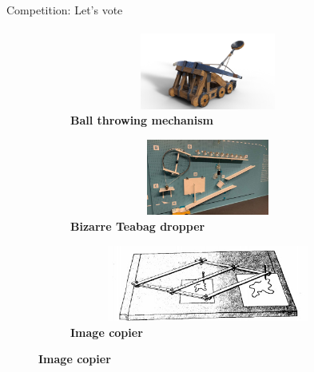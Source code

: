 \documentclass[aspectratio=169]{beamer}
\begin{document}
\begin{frame}[c]{Competition: Let's vote}
    \framesubtitle{}
    \vspace{-0.6cm}
    \begin{figure}[H]
        \begin{subfigure}[t]{0.32\textwidth}
            \centering\includegraphics[height=2.5cm,width=1\textwidth,keepaspectratio]{catapuylt.png}
            \caption{\textbf{Ball throwing mechanism}}
            \label{fig:catapuylt.png}
        \end{subfigure}
        \begin{subfigure}[t]{0.32\textwidth}
            \centering\includegraphics[height=2.5cm,width=1\textwidth,keepaspectratio]{overengineering.jpg}
            \caption{\textbf{Bizarre Teabag dropper}}
            \label{fig:overengineering.jpg}
        \end{subfigure}
        \begin{subfigure}[t]{0.32\textwidth}
            \centering\includegraphics[height=2.5cm,width=1\textwidth,keepaspectratio]{copycat.jpeg}
            \caption{\textbf{Image copier}}
            \label{fig:copycat.jpeg}
        \end{subfigure}


\end{figure}
\end{frame}
\end{document}
